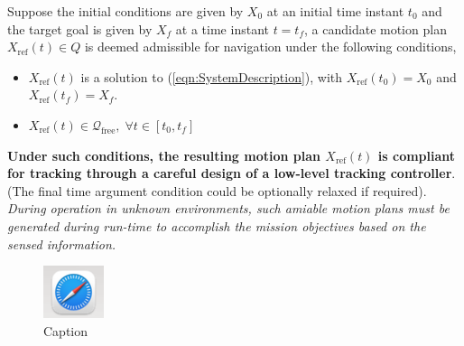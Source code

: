 \documentclass{article}
\begin{document}
    Suppose the initial conditions are given by $X_0$ at an initial time instant $t_0$ and the target goal is given by $X_f$ at a time instant $t=t_f$, a candidate motion plan $X_{\text{ref}}(t) \in Q$ is deemed admissible for navigation under the following conditions,
    \begin{itemize}
        \item $X_{\text{ref}}(t)$ is a solution to (\ref{eqn:SystemDescription}), with $X_{\text{ref}}(t_0) = X_0$ and $X_{\text{ref}}(t_f) = X_f$.
        \item $X_{\text{ref}}(t) \in \mathcal{Q}_{\text{free}},\; \forall t\in[t_0,t_f]$  
    \end{itemize}
    \textbf{Under such conditions, the resulting motion plan $X_{\text{ref}}(t)$ is compliant for tracking through a careful design of a low-level tracking controller}. (The final time argument condition could be optionally relaxed if required). \textit{During operation in unknown environments, such amiable motion plans must be generated during run-time to accomplish the mission objectives based on the sensed information.}
    \begin{figure}
        \centering
        \includegraphics[scale=0.5]{media/turtlebot3_burger_components.png}
        \caption{Caption}
        \label{fig:enter-label}
    \end{figure}
    
\end{document}
